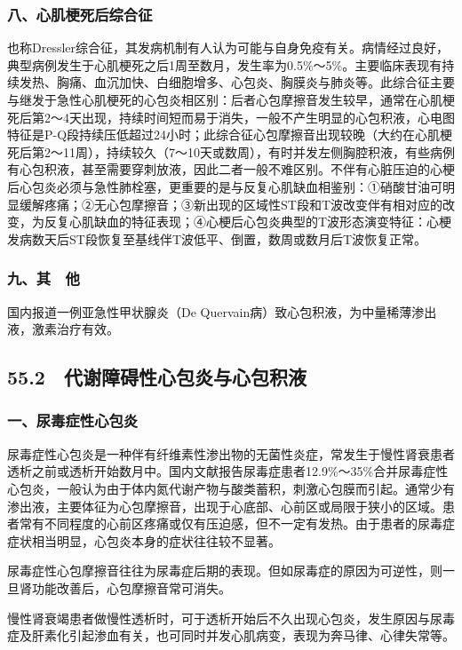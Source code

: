 \subsubsection{八、心肌梗死后综合征}

也称Dressler综合征，其发病机制有人认为可能与自身免疫有关。病情经过良好，典型病例发生于心肌梗死之后1周至数月，发生率为0.5\%～5\%。主要临床表现有持续发热、胸痛、血沉加快、白细胞增多、心包炎、胸膜炎与肺炎等。此综合征主要与继发于急性心肌梗死的心包炎相区别：后者心包摩擦音发生较早，通常在心肌梗死后第2～4天出现，持续时间短而易于消失，一般不产生明显的心包积液，心电图特征是P-Q段持续压低超过24小时；此综合征心包摩擦音出现较晚（大约在心肌梗死后第2～11周），持续较久（7～10天或数周），有时并发左侧胸腔积液，有些病例有心包积液，甚至需要穿刺放液，因此二者一般不难区别。不伴有心脏压迫的心梗后心包炎必须与急性肺栓塞，更重要的是与反复心肌缺血相鉴别：①硝酸甘油可明显缓解疼痛；②无心包摩擦音；③新出现的区域性ST段和T波改变伴有相对应的改变，为反复心肌缺血的特征表现；④心梗后心包炎典型的T波形态演变特征：心梗发病数天后ST段恢复至基线伴T波低平、倒置，数周或数月后T波恢复正常。

\subsubsection{九、其　他}

国内报道一例亚急性甲状腺炎（De
Quervain病）致心包积液，为中量稀薄渗出液，激素治疗有效。

\subsection{55.2　代谢障碍性心包炎与心包积液}

\subsubsection{一、尿毒症性心包炎}

尿毒症性心包炎是一种伴有纤维素性渗出物的无菌性炎症，常发生于慢性肾衰患者透析之前或透析开始数月中。国内文献报告尿毒症患者12.9\%～35\%合并尿毒症性心包炎，一般认为由于体内氮代谢产物与酸类蓄积，刺激心包膜而引起。通常少有渗出液，主要体征为心包摩擦音，出现于心底部、心前区或局限于狭小的区域。患者常有不同程度的心前区疼痛或仅有压迫感，但不一定有发热。由于患者的尿毒症症状相当明显，心包炎本身的症状往往较不显著。

尿毒症性心包摩擦音往往为尿毒症后期的表现。但如尿毒症的原因为可逆性，则一旦肾功能改善后，心包摩擦音常可消失。

慢性肾衰竭患者做慢性透析时，可于透析开始后不久出现心包炎，发生原因与尿毒症及肝素化引起渗血有关，也可同时并发心肌病变，表现为奔马律、心律失常等。


